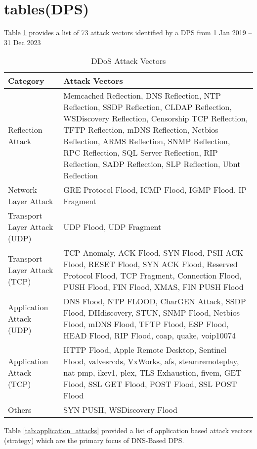 \section{tables(DPS)}\label{sec:table}
Table \ref{tab:ddos_attack_vectors} provides a list of 73 attack vectors identified by a DPS from 1 Jan 2019 – 31 Dec 2023


\begin{table}[!htbp]
\caption{DDoS Attack Vectors}
\label{tab:ddos_attack_vectors}
\centering
\begin{tabular}{|>{\raggedright\arraybackslash}p{2.7cm}|>{\raggedright\arraybackslash}p{4.8cm}|}
\hline
\textbf{Category} & \textbf{Attack Vectors} \\
\hline
Reflection Attack & Memcached Reflection, DNS Reflection, NTP Reflection, SSDP Reflection, CLDAP Reflection, WSDiscovery Reflection, Censorship TCP Reflection, TFTP Reflection, mDNS Reflection, Netbios Reflection, ARMS Reflection, SNMP Reflection, RPC Reflection, SQL Server Reflection, RIP Reflection, SADP Reflection, SLP Reflection, Ubnt Reflection \\
\hline
Network Layer Attack & GRE Protocol Flood, ICMP Flood, IGMP Flood, IP Fragment \\
\hline
Transport Layer Attack (UDP) & UDP Flood, UDP Fragment \\
\hline
Transport Layer Attack (TCP) & TCP Anomaly, ACK Flood, SYN Flood, PSH ACK Flood, RESET Flood, SYN ACK Flood, Reserved Protocol Flood, TCP Fragment, Connection Flood, PUSH Flood, FIN Flood, XMAS, FIN PUSH Flood \\
\hline
Application Attack (UDP) & DNS Flood, NTP FLOOD, CharGEN Attack, SSDP Flood, DHdiscovery, STUN, SNMP Flood, Netbios Flood, mDNS Flood, TFTP Flood, ESP Flood, HEAD Flood, RIP Flood, coap, quake, voip10074 \\
\hline
Application Attack (TCP) & HTTP Flood, Apple Remote Desktop, Sentinel Flood, valvesrcds, VxWorks, afs, steamremoteplay, nat pmp, ikev1, plex, TLS Exhaustion, fivem, GET Flood, SSL GET Flood, POST Flood, SSL POST Flood \\
\hline
Others & SYN PUSH, WSDiscovery Flood \\
\hline
\end{tabular}
\end{table}

Table \ref{tab:application_attacks} provided a list of application based attack vectors (strategy) \cite{zolotukhin2018data} which are the primary focus of DNS-Based DPS.

